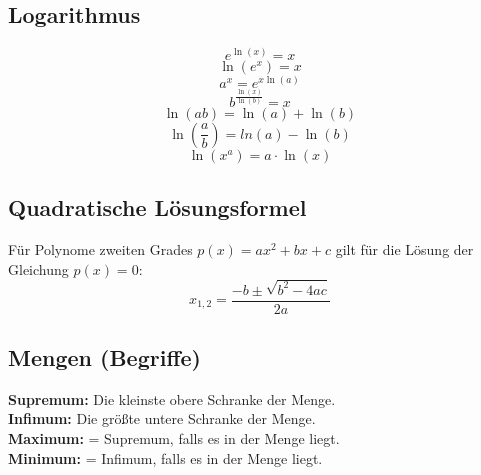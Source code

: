\documentclass[a4paper,twocolumn,10pt]{article}
\begin{document}
\subsection{Logarithmus}
\begin{equation*}
e^{\ln(x)}=x
\end{equation*}
\begin{equation*}
\ln(e^x)=x
\end{equation*}
\begin{equation*}
a^x=e^{x\ln(a)}
\end{equation*}
\begin{equation*}
b^{\frac{\ln(x)}{\ln(b)}}=x
\end{equation*}
\begin{equation*}
\ln(ab)=\ln(a)+\ln(b)
\end{equation*}
\begin{equation*}
\ln(\frac{a}{b})=ln(a)-\ln(b)
\end{equation*}
\begin{equation*}
\ln(x^a)=a\cdot\ln(x)
\end{equation*}

\subsection{Quadratische Lösungsformel}
Für Polynome zweiten Grades $p(x)=ax^2+bx+c$ gilt für die Lösung der Gleichung $p(x)=0$:
\begin{equation*}
x_{1,2}=\frac{-b\pm\sqrt{b^2-4ac}}{2a}
\end{equation*}

\subsection{Mengen (Begriffe)}
\textbf{Supremum:} Die kleinste obere Schranke der Menge.\\
\textbf{Infimum:} Die größte untere Schranke der Menge.\\
\textbf{Maximum:} = Supremum, falls es in der Menge liegt.\\
\textbf{Minimum:} = Infimum, falls es in der Menge liegt.
\end{document}
